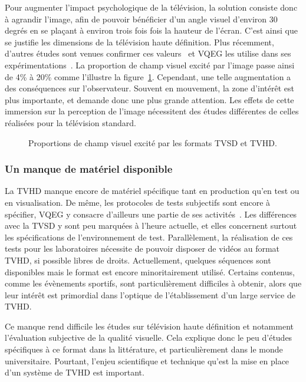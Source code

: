 Pour augmenter l'impact psychologique de la télévision, la solution consiste donc à agrandir l'image, afin de pouvoir bénéficier d'un angle visuel d'environ 30 degrés en se plaçant à environ trois fois fois la hauteur de l'écran. C'est ainsi que se justifie les dimensions de la télévision haute définition. Plus récemment, d'autres études sont venues confirmer ces valeurs~\cite{svt-assesstudy} et VQEG les utilise dans ses expérimentations~\cite{vqeg-hdtvtestplan}. La proportion de champ visuel excité par l'image passe ainsi de 4\% à 20\% comme l'illustre la figure~\ref{fig:champVisuelHD}. Cependant, une telle augmentation a des conséquences sur l'observateur. Souvent en mouvement, la zone d'intérêt est plus importante, et demande donc une plus grande attention. Les effets de cette immersion sur la perception de l'image nécessitent des études différentes de celles réalisées pour la télévision standard.

\begin{figure}[htbp]
  \centering
  \begin{tikzpicture}[text centered, scale=1.2]\end{tikzpicture}
  \caption{Proportions de champ visuel excité par les formats TVSD et TVHD.}
  \label{fig:champVisuelHD}
\end{figure}


\subsubsection{Un manque de matériel disponible}
La TVHD manque encore de matériel spécifique tant en production qu'en test ou en visualisation. De même, les protocoles de tests subjectifs sont encore à spécifier, VQEG y consacre d'ailleurs une partie de ses activités~\cite{vqeg-hdtvtestplan}. Les différences avec la TVSD y sont peu marquées à l'heure actuelle, et elles concernent surtout les spécifications de l'environnement de test. Parallèlement, la réalisation de ces tests pour les laboratoires nécessite de pouvoir disposer de vidéos au format TVHD, si possible libres de droits. Actuellement, quelques séquences sont disponibles mais le format est encore minoritairement utilisé. Certains contenus, comme les évènements sportifs, sont particulièrement difficiles à obtenir, alors que leur intérêt est primordial dans l'optique de l'établissement d'un large service de TVHD.

Ce manque rend difficile les études sur télévision haute définition et notamment l'évaluation subjective de la qualité visuelle. Cela explique donc le peu d'études spécifiques à ce format dans la littérature, et particulièrement dans le monde universitaire. Pourtant, l'enjeu scientifique et technique qu'est la mise en place d'un système de TVHD est important.


